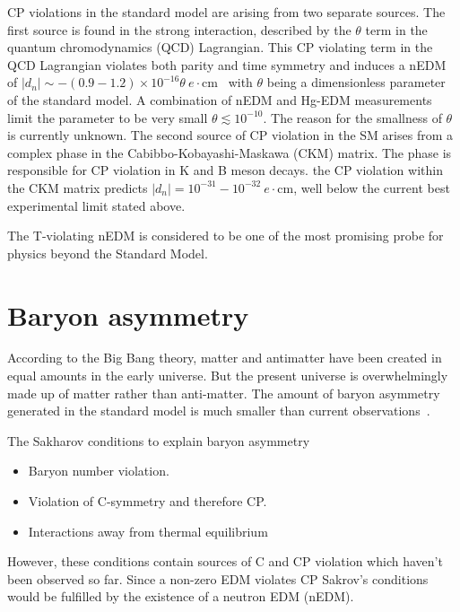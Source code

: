 CP violations in the standard model are arising from two separate
sources.  The first source is found in the strong interaction,
described by the $\theta$ term in the quantum chromodynamics (QCD)
Lagrangian.  This CP violating term in the QCD Lagrangian violates
both parity and time symmetry and induces a nEDM of
$|d_n|\sim-(0.9-1.2)\times
10^{−16}\theta~e\cdot$cm~\cite{bib:chuppetal} with $\theta$ being a
dimensionless parameter of the standard model.  A combination of nEDM
and Hg-EDM measurements limit the parameter to be very small
$\theta\lesssim 10^{-10}$.  The reason for the smallness of $\theta$
is currently unknown.  The second source of CP violation in the SM
arises from a complex phase in the Cabibbo-Kobayashi-Maskawa (CKM)
matrix\cite{PhysRevLett.10.531}.  The phase is responsible for CP
violation in K and B meson decays.  the CP violation within the CKM
matrix predicts $|d_n| = 10^{-31} - 10^{-32}~e\cdot$cm, well below the
current best experimental limit stated above.

The T-violating nEDM is considered to be one of the most promising probe for
physics beyond the Standard Model.

\section{Baryon asymmetry}

According to the Big Bang theory, matter and antimatter have been
created in equal amounts in the early universe. But the present
universe is overwhelmingly made up of matter rather than
anti-matter.
The amount of baryon asymmetry generated in the standard model is much
smaller than current observations~\cite{bib:morrissey}.

The Sakharov conditions to explain baryon
asymmetry\cite{budker2013optical}\cite{PhysRevLett.10.531}
\begin{itemize}
    \item Baryon number violation.
    \item Violation of C-symmetry and therefore CP.
    \item Interactions away from thermal equilibrium
\end{itemize}
However, these conditions contain sources of C and CP violation which
haven't been observed so far. Since a non-zero EDM violates CP
Sakrov's conditions would be fulfilled by the existence of a neutron
EDM (nEDM).


